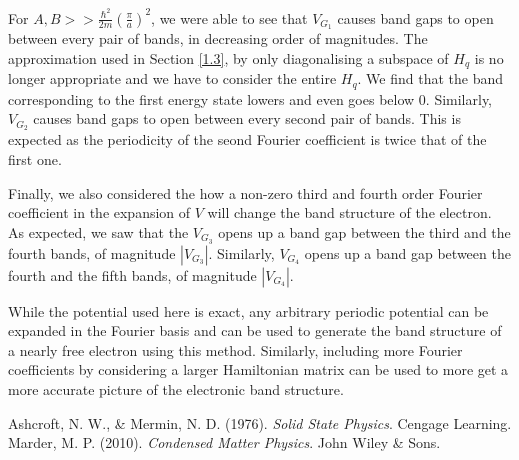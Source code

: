 \documentclass[12pt,a4paper]{article}
\begin{document}
For $A, B >> \frac{\hbar^2}{2m} \left(\frac{\pi}{a}\right)^2$, we were able to see that $V_{G_1}$ causes band gaps to open between every pair of bands, in decreasing order of magnitudes. The approximation used in Section \ref{1.3}, by only diagonalising a subspace of $H_q$ is no longer appropriate and we have to consider the entire $H_q$. We find that the band corresponding to the first energy state lowers and even goes below $0$. Similarly, $V_{G_2}$ causes band gaps to open between every second pair of bands. This is expected as the periodicity of the seond Fourier coefficient is twice that of the first one. 

Finally, we also considered the how a non-zero third and fourth order Fourier coefficient in the expansion of $V$ will change the band structure of the electron. As expected, we saw that the $V_{G_3}$ opens up a band gap between the third and the fourth bands, of magnitude $|V_{G_3}|$. Similarly, $V_{G_4}$ opens up a band gap between the fourth and the fifth bands, of magnitude $|V_{G_4}|$.

While the potential used here is exact, any arbitrary periodic potential can be expanded in the Fourier basis and can be used to generate the band structure of a nearly free electron using this method. Similarly, including more Fourier coefficients by considering a larger Hamiltonian matrix can be used to more get a more accurate picture of the electronic band structure. 

\begin{thebibliography}{9}
    Ashcroft, N. W., \& Mermin, N. D. (1976). \emph{Solid State Physics}. Cengage Learning.
    Marder, M. P. (2010). \emph{Condensed Matter Physics}. John Wiley \& Sons.
\end{thebibliography}
\end{document}
